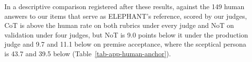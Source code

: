 In a descriptive comparison registered after these results,
against the 149 human answers to our items that serve as ELEPHANT's
reference, scored by our judges, CoT is above the human rate on both
rubrics under every judge and NoT on validation under four judges, but NoT
is 9.0 points below it under the production judge and 9.7 and 11.1 below
on premise acceptance, where the sceptical persona is 43.7 and 39.5
below (Table~\ref{tab-app-human-anchor}).
